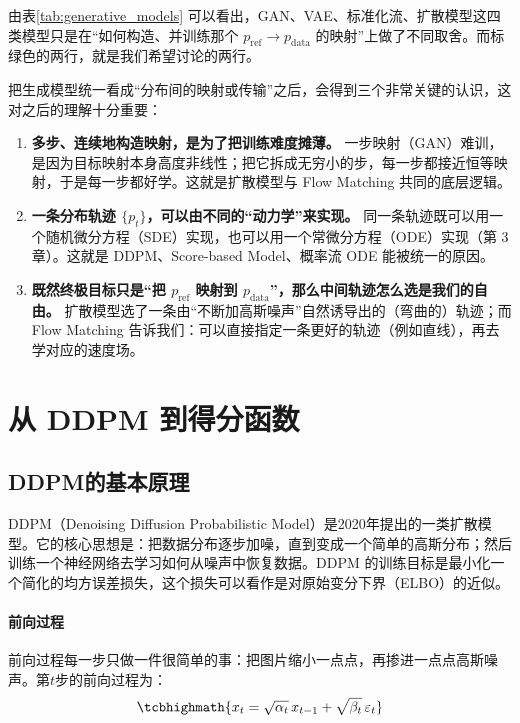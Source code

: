 由表\cref{tab:generative_models} 可以看出，GAN、VAE、标准化流、扩散模型这四类模型只是在“如何构造、并训练那个 $p_{\text{ref}}\to p_{\text{data}}$ 的映射”上做了不同取舍。而标绿色的两行，就是我们希望讨论的两行。

把生成模型统一看成“分布间的映射或传输”之后，会得到三个非常关键的认识，这对之后的理解十分重要：
\begin{enumerate}
\item \textbf{多步、连续地构造映射，是为了把训练难度摊薄。} 一步映射（GAN）难训，是因为目标映射本身高度非线性；把它拆成无穷小的步，每一步都接近恒等映射，于是每一步都好学。这就是扩散模型与 Flow Matching 共同的底层逻辑。
\item \textbf{一条分布轨迹 $\{p_t\}$，可以由不同的“动力学”来实现。} 同一条轨迹既可以用一个随机微分方程（SDE）实现，也可以用一个常微分方程（ODE）实现（第 3 章）。这就是 DDPM、Score-based Model、概率流 ODE 能被统一的原因。
\item \textbf{既然终极目标只是“把 $p_{\text{ref}}$ 映射到 $p_{\text{data}}$”，那么中间轨迹怎么选是我们的自由。} 扩散模型选了一条由“不断加高斯噪声”自然诱导出的（弯曲的）轨迹；而 Flow Matching 告诉我们：可以直接指定一条更好的轨迹（例如直线），再去学对应的速度场。
\end{enumerate}

\section{从 DDPM 到得分函数}

\subsection{DDPM的基本原理}

DDPM（Denoising Diffusion Probabilistic Model）是2020年提出的一类扩散模型\cite{ho2020denoisingdiffusionprobabilisticmodels}。它的核心思想是：把数据分布逐步加噪，直到变成一个简单的高斯分布；然后训练一个神经网络去学习如何从噪声中恢复数据。DDPM 的训练目标是最小化一个简化的均方误差损失，这个损失可以看作是对原始变分下界（ELBO）的近似。

\paragraph{前向过程} 

前向过程每一步只做一件很简单的事：把图片缩小一点点，再掺进一点点高斯噪声。第$t$步的前向过程为：
\begin{equation}\label{eq:ddpm_forward}
    \tcbhighmath{x_t = \sqrt{\alpha_t}\,x_{t-1} + \sqrt{\beta_t}\,\varepsilon_t}
\end{equation}

